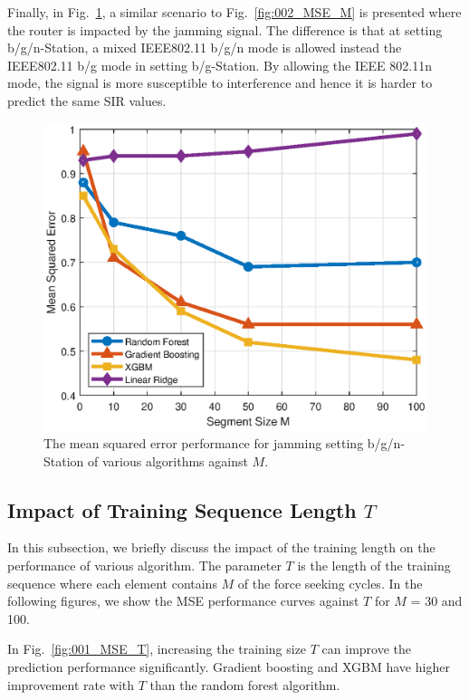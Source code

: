 Finally, in Fig.~\ref{fig:004_MSE_M}, a similar scenario to Fig.~\ref{fig:002_MSE_M} is presented where the router is impacted by the jamming signal. The difference is that at setting b/g/n-Station, a mixed IEEE802.11 b/g/n mode is allowed instead the IEEE802.11 b/g mode in setting b/g-Station. By allowing the IEEE 802.11n mode, the signal is more susceptible to interference and hence it is harder to predict the same SIR values. 

		\begin{figure}[tbp]
	    \centering
		\includegraphics[width=0.9\columnwidth]{./chapter-ftml/plots/004_MSE_M.eps}
		\caption{The mean squared error performance for jamming setting b/g/n-Station of various algorithms against $M$.}
		\label{fig:004_MSE_M}      
	\end{figure}

\subsection{Impact of Training Sequence Length $T$}
In this subsection, we briefly discuss the impact of the training length on the performance of various algorithm. The parameter $T$ is the length of the training sequence where each element contains $M$ of the force seeking cycles. In the following figures, we show the MSE performance curves against $T$ for $M$ = 30 and 100. 

In Fig.~\ref{fig:001_MSE_T}, increasing the training size $T$ can improve the prediction performance significantly. Gradient boosting and XGBM have higher improvement rate with $T$ than the random forest algorithm. 

